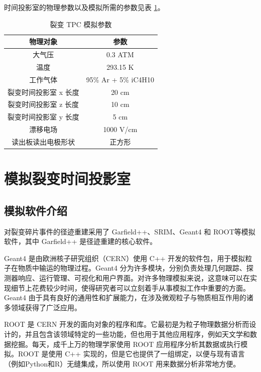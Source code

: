 \documentclass[AutoFakeBold]{LZUThesis}
\begin{document}
时间投影室的物理参数以及模拟所需的参数见表 \ref{tbl_TPC_parameters}。

\begin{table}[H]
    \centering
    \caption{裂变 TPC 模拟参数}
    \begin{tabular}{cc} %
    \toprule
    物理对象& 参数 \\
    \midrule
    大气压 & 0.3 ATM \\
    温度 & 293.15 K \\
    工作气体 & 95\% Ar + 5\% iC4H10 \\
    裂变时间投影室 x 长度 & 20 cm \\
    裂变时间投影室 z 长度 & 10 cm \\
    裂变时间投影室 y 长度 & 5 cm \\
    漂移电场 & 1000 V/cm \\
    读出板读出电极形状 & 正方形 \\
    \bottomrule
    \end{tabular}
    \label{tbl_TPC_parameters}
\end{table}







\section{模拟裂变时间投影室}
\subsection{模拟软件介绍}
对裂变碎片事件的径迹重建采用了 Garfield++、SRIM、Geant4 和 ROOT等模拟软件，其中 Garfield++ 是径迹重建的核心软件。

Geant4 是由欧洲核子研究组织（CERN）使用 C++ 开发的软件包，用于模拟粒子在物质中输运的物理过程。Geant4 分为许多模块，分别负责处理几何跟踪、探测器响应、运行管理、可视化和用户界面。对许多物理模拟来说，这意味可以在实现细节上花费较少时间，使得研究者可以立刻着手从事模拟工作中重要的方面。Geant4 由于具有良好的通用性和扩展能力，在涉及微观粒子与物质相互作用的诸多领域获得了广泛应用。

ROOT 是 CERN 开发的面向对象的程序和库。它最初是为粒子物理数据分析而设计的，并且包含该领域特定的一些功能，但也用于其他应用程序，例如天文学和数据挖掘。每天，成千上万的物理学家使用 ROOT 应用程序分析其数据或执行模拟。ROOT 是使用 C++ 实现的，但是它也提供了一组绑定，以便与现有语言（例如Python和R）无缝集成，所以使用 ROOT 用来数据分析非常地方便。
\end{document}
